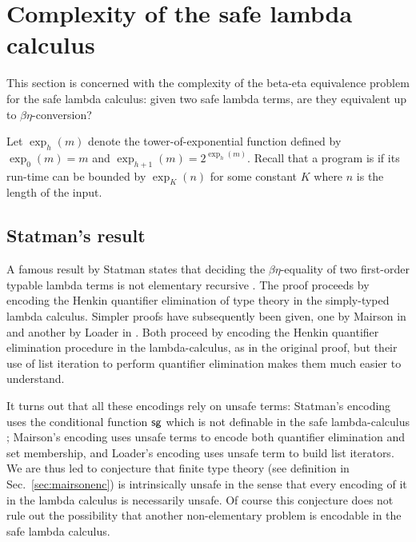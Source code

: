 \newcommand\bigo{\mathcal{O}} %
\newcommand\booltype{\mathsf{B}}
\newcommand\towerexp[2]{\exp_{#1}(#2)}

\section{Complexity of the safe lambda calculus}
This section is concerned with the complexity of the
beta-eta equivalence problem for the safe lambda calculus:
given two safe lambda terms, are they equivalent up to $\beta\eta$-conversion?



Let $\towerexp{h}{m}$ denote the tower-of-exponential function
defined by $\towerexp{0}{m} = m$ and $\towerexp{h+1}{m} =
2^{\towerexp{h}{m}}$. Recall that a program is
 if its run-time can be bounded by
$\towerexp{K}{n}$ for some constant $K$ where $n$ is the length of
the input.

\subsection{Statman's result}

A famous result by Statman  states that deciding the
$\beta\eta$-equality of two first-order typable lambda terms is not
elementary recursive \cite{Statman:1979:TLE}. The proof proceeds by
encoding the Henkin quantifier elimination of type theory in the
simply-typed lambda calculus. Simpler proofs have subsequently been
given, one by Mairson in \cite{mairson1992spt} and another by Loader
in \cite{Loader1998}. Both proceed by encoding the Henkin quantifier
elimination procedure in the lambda-calculus, as in the original
proof, but their use of list iteration to perform quantifier
elimination makes them much easier to understand.

It turns out that all these encodings rely on unsafe terms:
Statman's encoding uses the conditional function $\sf sg$ which is
not definable in the safe lambda-calculus
\cite{blumong:safelambdacalculus}; Mairson's encoding uses unsafe
terms to encode both quantifier elimination and set membership, and
Loader's encoding uses unsafe term to build list iterators. We are
thus led to conjecture that finite type theory (see definition in
Sec.\ \ref{sec:mairsonenc}) is intrinsically unsafe in the sense
that every encoding of it in the lambda calculus is necessarily
unsafe. Of course this conjecture does not rule out the possibility
that another non-elementary problem is encodable in the safe lambda
calculus.

